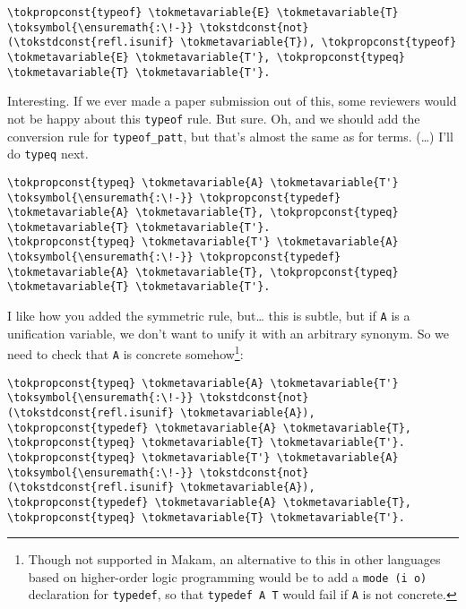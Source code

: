 \importantCodeblock{}

\begin{verbatim}
\tokpropconst{typeof} \tokmetavariable{E} \tokmetavariable{T} \toksymbol{\ensuremath{:\!-}} \tokstdconst{not}(\tokstdconst{refl.isunif} \tokmetavariable{T}), \tokpropconst{typeof} \tokmetavariable{E} \tokmetavariable{T'}, \tokpropconst{typeq} \tokmetavariable{T} \tokmetavariable{T'}.
\end{verbatim}

\importantCodeblockEnd{}

\heroSTUDENT{} Interesting. If we ever made a paper submission out of this,
some reviewers would not be happy about this \texttt{typeof} rule. But
sure. Oh, and we should add the conversion rule for
\texttt{typeof\_patt}, but that's almost the same as for terms.
(\ldots{}) I'll do \texttt{typeq} next.

\begin{verbatim}
\tokpropconst{typeq} \tokmetavariable{A} \tokmetavariable{T'} \toksymbol{\ensuremath{:\!-}} \tokpropconst{typedef} \tokmetavariable{A} \tokmetavariable{T}, \tokpropconst{typeq} \tokmetavariable{T} \tokmetavariable{T'}.
\tokpropconst{typeq} \tokmetavariable{T'} \tokmetavariable{A} \toksymbol{\ensuremath{:\!-}} \tokpropconst{typedef} \tokmetavariable{A} \tokmetavariable{T}, \tokpropconst{typeq} \tokmetavariable{T} \tokmetavariable{T'}.
\end{verbatim}

\heroADVISOR{} I like how you added the symmetric rule, but\ldots{} this is
subtle, but if \texttt{A} is a unification variable, we don't want to
unify it with an arbitrary synonym. So we need to check that \texttt{A}
is concrete
somehow\footnote{Though not supported in Makam, an alternative to this in other languages based on higher-order logic programming would be to add a \texttt{mode (i o)} declaration for \texttt{typedef}, so that \texttt{typedef A T} would fail if \texttt{A} is not concrete.}:

\begin{verbatim}
\tokpropconst{typeq} \tokmetavariable{A} \tokmetavariable{T'} \toksymbol{\ensuremath{:\!-}} \tokstdconst{not}(\tokstdconst{refl.isunif} \tokmetavariable{A}), \tokpropconst{typedef} \tokmetavariable{A} \tokmetavariable{T}, \tokpropconst{typeq} \tokmetavariable{T} \tokmetavariable{T'}.
\tokpropconst{typeq} \tokmetavariable{T'} \tokmetavariable{A} \toksymbol{\ensuremath{:\!-}} \tokstdconst{not}(\tokstdconst{refl.isunif} \tokmetavariable{A}), \tokpropconst{typedef} \tokmetavariable{A} \tokmetavariable{T}, \tokpropconst{typeq} \tokmetavariable{T} \tokmetavariable{T'}.
\end{verbatim}

